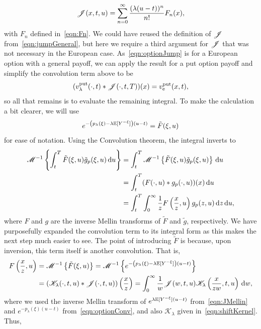       \begin{equation}
      		\label{eqn:Jnew}
        \mathscr J(x,t,u) = \sum\limits_{n=0}^\infty \frac{(\lambda(u-t))^n}{n!}F_n(x),
      \end{equation}
    with $F_n$ defined in~\eqref{eqn:Fn}. We could have reused the definition of $\mathscr J$ from~\eqref{eqn:jumpGeneral}, but here we require a third argument for $\mathscr J$ that was not necessary in the European case.
    As~\eqref{eqn:optionJump} is for a European option with a general payoff, we can apply the result for a put option payoff and simplify the convolution term above to be
      $$
        (v_\lambda^{\text{put}}(\cdot,t) \ast \mathscr J(\cdot, t, T))(x) = v_{\text{e}}^{\text{put}}(x,t),
      $$
    so all that remains is to evaluate the remaining integral. To make the calculation a bit clearer, we will use
    	$$
    		e^{-\left(p_\lambda(\xi) -\lambda\mathbb E[Y^{-\xi}]\right)(u-t)} = \tilde{F}(\xi,u)
    	$$
    	for ease of notation. Using the Convolution theorem, the integral inverts to
      \begin{align*}
          \mathscr M^{-1}\left\{ \int_t^T \tilde{F}(\xi,u)\tilde{g}_p(\xi,u) \, \mathrm d u \right\} &=
          \int_t^T \mathscr M^{-1}\left\{\tilde{F}(\xi,u)\tilde{g}_p(\xi,u)\right\} \,\mathrm d u \\
          &= \int_t^T (F(\cdot,u)\ast g_p(\cdot,u))(x) \, \mathrm d u \\
          &= \int_t^T \int_0^\infty \frac{1}{z}F\left(\frac{x}{z},u\right)g_p(z,u) \, \mathrm d z \, \mathrm d u,
        \end{align*}
        where $F$ and $g$ are the inverse Mellin transforms of $\tilde F$ and $\tilde g$, respectively. We have purposefully expanded the convolution term to its integral form as this makes the next step much easier to see. The point of introducing $\tilde F$ is because, upon inversion, this term itself is another convolution. That is,
        \begin{align*}
        	F\left(\frac{x}{z},u\right) &= \mathscr M^{-1}\left\{\tilde{F}(\xi,u)\right\} = \mathscr M^{-1}\left\{e^{-\left(p_\lambda(\xi) -\lambda\mathbb E[Y^{-\xi}]\right)(u-t)}\right\} \\
        	&= (\mathscr K_\lambda(\cdot,t,u)\ast \mathscr J(\cdot,t,u))\left(\frac{x}{z}\right) = \int_0^\infty \frac{1}{w}\mathscr J(w,t,u)\mathscr K_\lambda\left( \frac{x}{zw},t,u \right) \, \mathrm d w,
        \end{align*}
        where we used the inverse Mellin transform of $e^{\lambda\mathbb E[Y^{-\xi}](u-t)}$ from~\eqref{eqn:JMellin} and $e^{-p_\lambda(\xi)(u-t)}$ from~\eqref{eqn:optionConv}, and also $\mathscr{K}_\lambda$ given in~\eqref{eqn:shiftKernel}. Thus,
